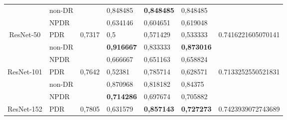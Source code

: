 \begin{table}[hbtp]
\begin{center}
\begin{tabular}{|c|l|c|l|l|l|c|}
			& non-DR                                             &                          & 0,848485                                          & \textbf{0,848485}                                & 0,848485                                        &                                      \\ \cline{2-2} \cline{4-6}
			& NPDR                                               &                          & 0,634146                                          & 0,604651                                         & 0,619048                                        &                                      \\ \cline{2-2} \cline{4-6}
			\multirow{-3}{*}{ResNet-50}  & PDR                                                & \multirow{-3}{*}{0,7317} & 0,5                                               & 0,571429                                         & 0,533333                                        & \multirow{-3}{*}{0.7416221605070141} \\ \hline
			& non-DR                                             &                          & \textbf{0,916667}                                 & 0,833333                                         & \textbf{0,873016}                               &                                      \\ \cline{2-2} \cline{4-6}
			& NPDR                                               &                          & 0,666667                                          & 0,651163                                         & 0,658824                                        &                                      \\ \cline{2-2} \cline{4-6}
			\multirow{-3}{*}{ResNet-101} & PDR                                                & \multirow{-3}{*}{0,7642} & 0,52381                                           & 0,785714                                         & 0,628571                                        & \multirow{-3}{*}{0.7133252550521831} \\ \hline
			& non-DR                                             &                          & 0,870968                                          & 0,818182                                         & 0,84375                                         &                                      \\ \cline{2-2} \cline{4-6}
			& NPDR                                               &                          & \textbf{0,714286}                                 & 0,697674                                         & 0,705882                                        &                                      \\ \cline{2-2} \cline{4-6}
			\multirow{-3}{*}{ResNet-152} & PDR                                                & \multirow{-3}{*}{0,7805} & 0,631579                                          & \textbf{0,857143}                                & \textbf{0,727273}                               & \multirow{-3}{*}{0.7423939072743689} \\ \hline
		\end{tabular}
	\end{center}
\end{table}

